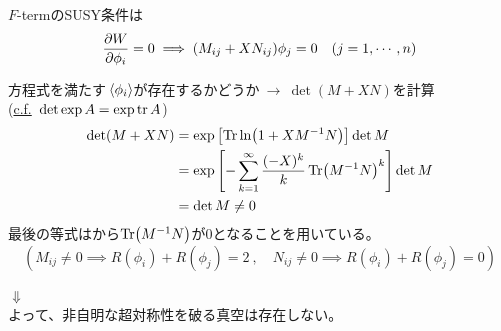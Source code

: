 \documentclass[
  unicode,a4paper,9pt,
  xcolor = {dvipsnames,svgnames},
  hyperref ={colorlinks=true,citecolor=Navy,linkcolor=NavyBlue,urlcolor=purple},
  ja=standard,lualatex
]{beamer}
\begin{document}
\begin{frame}

  $F$-termのSUSY条件は
  \begin{equation}
    \pdv{W}{\phi_{i}}
    =
    0
    \implies
    (M_{ij}+XN_{ij})\phi_{j}
    =
    0
    \quad
    (j=1,\cdots,n)
    \nonumber
  \end{equation}

  方程式を満たす$\ev*{\phi_{i}}$が存在するかどうか$\ \rightarrow\ \det(M+XN)$を計算\\
  (\uline{c.f.}\ $\det\exp A=\exp\tr A$)
  \begin{align}
    \det (M+XN)
     & =
    \exp\left[ \Tr\ln (1+XM^{-1}N) \right]\det M
    \nonumber
    \\
     & =
    \exp\left[
      -\sum_{k=1}^{\infty}\frac{(-X)^{k}}{k}\Tr(M^{-1}N)^{k}
      \right]
    \det M
    \nonumber
    \\
     &
    =
    \det M\neq 0
    \nonumber
  \end{align}
  最後の等式はから$\Tr (M^{-1}N)$が$0$となることを用いている。
  \begin{equation}
    \left(
    M_{ij}\neq 0
    \implies
    R(\phi_{i})+R(\phi_{j})=2
    \ ,\quad
    N_{ij}\neq 0
    \implies
    R(\phi_{i})+R(\phi_{j})=0
    \right)
    \nonumber
  \end{equation}

  \begin{center}
    {\Huge $\Downarrow$}\\
    よって、非自明な超対称性を破る真空は存在しない。
  \end{center}

\end{frame}
\end{document}
